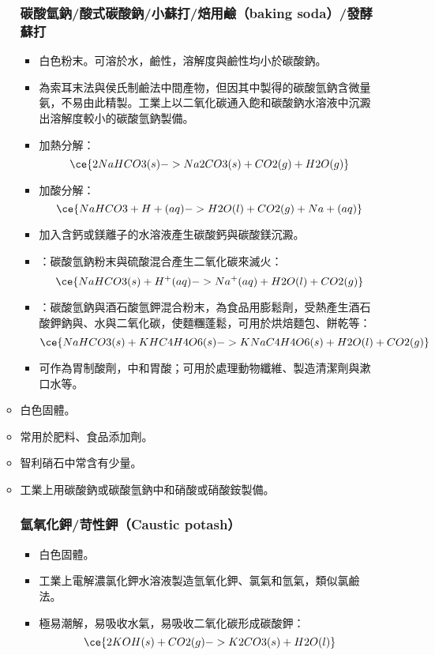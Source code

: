 \documentclass[a4paper,12pt]{report}
\begin{document}
\begin{itemize}
\begin{itemize}
\subsubsection{碳酸氫鈉/酸式碳酸鈉/小蘇打/焙用鹼（baking soda）/發酵蘇打}
\begin{itemize}
\item 白色粉末。可溶於水，鹼性，溶解度與鹼性均小於碳酸鈉。
\item 為索耳末法與侯氏制鹼法中間產物，但因其中製得的碳酸氫鈉含微量氨，不易由此精製。工業上以二氧化碳通入飽和碳酸鈉水溶液中沉澱出溶解度較小的碳酸氫鈉製備。
\item 加熱分解：
\[\ce{2NaHCO3(s) -> Na2CO3(s) + CO2(g) + H2O(g)}\]
\item 加酸分解：
\[\ce{NaHCO3 + H+(aq) -> H2O(l) + CO2(g) + Na+(aq)}\]
\item 加入含鈣或鎂離子的水溶液產生碳酸鈣與碳酸鎂沉澱。
\item {}：碳酸氫鈉粉末與硫酸混合產生二氧化碳來滅火：
\[\ce{NaHCO3(s) + H^+(aq) -> Na^+(aq) + H2O(l) + CO2(g)}\]
\item {}：碳酸氫鈉與酒石酸氫鉀混合粉末，為食品用膨鬆劑，受熱產生酒石酸鉀鈉與、水與二氧化碳，使麵糰蓬鬆，可用於烘焙麵包、餅乾等：
\[\ce{NaHCO3(s) + KHC4H4O6(s) -> KNaC4H4O6(s) + H2O(l) + CO2(g)}\]
\item 可作為胃制酸劑，中和胃酸；可用於處理動物纖維、製造清潔劑與漱口水等。
\end{itemize}
\bit
\item 白色固體。
\item 常用於肥料、食品添加劑。
\item 智利硝石中常含有少量。
\item 工業上用碳酸鈉或碳酸氫鈉中和硝酸或硝酸銨製備。
\eit
\subsubsection{氫氧化鉀/苛性鉀（Caustic potash）}
\begin{itemize}
\item 白色固體。
\item 工業上電解濃氯化鉀水溶液製造氫氧化鉀、氯氣和氫氣，類似氯鹼法。
\item 極易潮解，易吸收水氣，易吸收二氧化碳形成碳酸鉀：
\[\ce{2KOH(s) + CO2(g) -> K2CO3(s) + H2O(l)}\]
\end{itemize}

\end{itemize}
\end{itemize}
\end{document}
